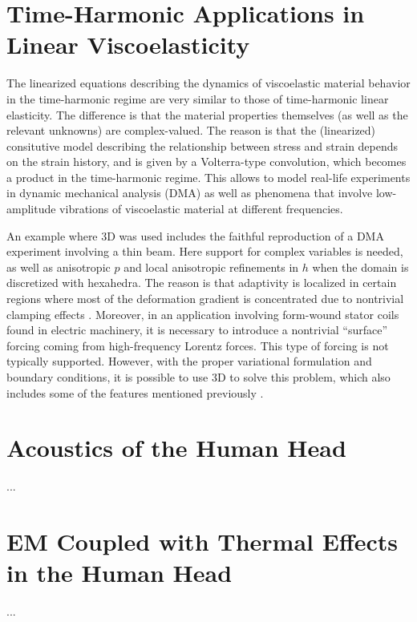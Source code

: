 \section{Time-Harmonic Applications in Linear Viscoelasticity}
\label{sec:visco-elasticity}

The linearized equations describing the dynamics of viscoelastic material behavior in the time-harmonic regime are very similar to those of time-harmonic linear elasticity. The difference is that the material properties themselves (as well as the relevant unknowns) are complex-valued. The reason is that the (linearized) consitutive model describing the relationship between stress and strain depends on the strain history, and is given by a Volterra-type convolution, which becomes a product in the time-harmonic regime. This allows to model real-life experiments in dynamic mechanical analysis (DMA) as well as phenomena that involve low-amplitude vibrations of viscoelastic material at different frequencies.

An example where \hp3D was used includes the faithful reproduction of a DMA experiment involving a thin beam. Here support for complex variables is needed, as well as anisotropic $p$ and local anisotropic refinements in $h$ when the domain is discretized with hexahedra. The reason is that adaptivity is localized in certain regions where most of the deformation gradient is concentrated due to nontrivial clamping effects \cite{fuentes2017viscoelasticity}. Moreover, in an application involving form-wound stator coils found in electric machinery, it is necessary to introduce a nontrivial ``surface'' forcing coming from high-frequency Lorentz forces. This type of forcing is not typically supported. However, with the proper variational formulation and boundary conditions, it is possible to use \hp3D to solve this problem, which also includes some of the features mentioned previously \cite{fuentes2018phd}.

\section{Acoustics of the Human Head}
\label{sec:human-head}

...

\section{EM Coupled with Thermal Effects in the Human Head}
\label{sec:human-head}

...


%


